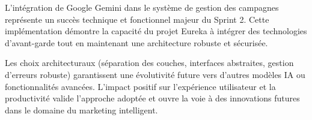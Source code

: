 L'intégration de Google Gemini dans le système de gestion des campagnes représente un succès technique et fonctionnel majeur du Sprint 2. Cette implémentation démontre la capacité du projet Eureka à intégrer des technologies d'avant-garde tout en maintenant une architecture robuste et sécurisée.

Les choix architecturaux (séparation des couches, interfaces abstraites, gestion d'erreurs robuste) garantissent une évolutivité future vers d'autres modèles IA ou fonctionnalités avancées. L'impact positif sur l'expérience utilisateur et la productivité valide l'approche adoptée et ouvre la voie à des innovations futures dans le domaine du marketing intelligent.
